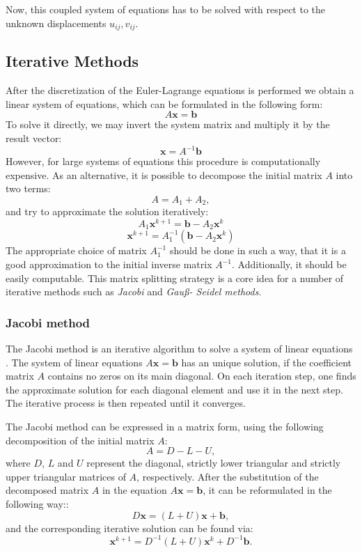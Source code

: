 Now, this coupled system of equations has to be solved with respect to the unknown displacements $u_{ij},  v_{ij}$. 

\subsection{Iterative Methods}
\label{iterative_methods}

After the discretization of the Euler-Lagrange equations is performed we obtain a linear system of equations, which can be formulated in the following form:
$$ A \textbf{x} = \textbf{b} $$
To solve it directly, we may invert the system matrix and multiply it by the result vector:
$$ \textbf{x} = A^{-1} \textbf{b} $$
However, for large systems of equations this procedure is computationally expensive. As an alternative, it is possible to decompose the initial matrix $A$ into two terms:
$$ A = A_1 + A_2, $$
and try to approximate the solution iteratively: 
$$ A_1 \textbf{x}^{k+1} = \textbf{b} - A_2 \textbf{x}^k $$
$$ \textbf{x}^{k+1} = A_1^{-1} (\textbf{b} - A_2 \textbf{x}^k)$$
The appropriate choice of matrix $A^{-1}_1$ should be done in such a way, that it is a good approximation to the initial inverse matrix $A^{-1}$. Additionally, it should be easily computable. This matrix splitting strategy is a core idea for a number of iterative methods such as \textit{Jacobi} and \textit{Gau\ss - Seidel methods}. 

\subsubsection{Jacobi method}
\label{jacobi_method}



The Jacobi method is an iterative algorithm to solve a system of linear equations \cite{Saad03}. The system of linear equations $A \textbf{x} = \textbf{b}$ has an unique solution, if the coefficient matrix $A$ contains no zeros on its main diagonal. On each iteration step, one finds the approximate solution for each diagonal element and use it in the next step. The iterative process is then repeated until it converges. 

The Jacobi method can be expressed in a matrix form, using the following decomposition of the initial matrix $A$:
%
\begin{equation}
A = D - L - U,
\end{equation}
%
where $D$, $L$ and $U$ represent the diagonal, strictly lower triangular and strictly upper triangular matrices of $A$, respectively. After the substitution of the decomposed matrix $A$ in the equation $A \textbf{x} = \textbf{b}$, it can be reformulated in the following way::
%
\begin{equation}
D \textbf{x} = (L + U)\textbf{x} + \textbf{b},
\end{equation}
%
and the corresponding iterative solution can be found via:
%
\begin{equation}
\textbf{x}^{k+1} = D^{-1}(L + U)\textbf{x}^{k} + D^{-1}\textbf{b}.
\end{equation}


